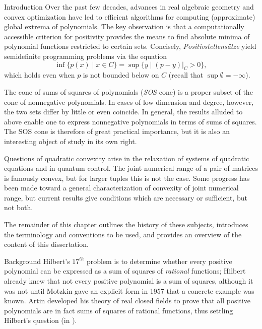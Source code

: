 \documentclass[12pt,oneside,final]{ucthesisucsbmath2010}
\theoremstyle{definition}
\begin{document}
\begin{chapter}{Introduction}
Over the past few decades, advances in real algebraic geometry and convex optimization have led to efficient algorithms for computing (approximate) global extrema of polynomials. The key observation is that a computationally accessible criterion for positivity provides the means to find absolute minima of polynomial functions restricted to certain sets. Concisely, \emph{Positivstellens\"{a}tze} yield semidefinite programming problems via the equation
\[ \inf \{p(x) \mid x \in C\} = \sup \{y \mid (p-y)|_C > 0\},\]
which holds even when $p$ is not bounded below on $C$ (recall that $\sup \emptyset = -\infty$).

The cone of sums of squares of polynomials (\emph{SOS} cone) is a proper subset of the cone of nonnegative polynomials. In cases of low dimension and degree, however, the two sets differ by little or even coincide. In general, the results alluded to above enable one to express nonnegative polynomials in terms of sums of squares. The SOS cone is therefore of great practical importance, but it is also an interesting object of study in its own right. 

Questions of quadratic convexity arise in the relaxation of systems of quadratic equations and in quantum control. The joint numerical range of a pair of matrices is famously convex, but for larger tuples this is not the case. Some progress has been made toward a general characterization of convexity of joint numerical range, but current results give conditions which are necessary or sufficient, but not both.

The remainder of this chapter outlines the history of these subjects, introduces the terminology and conventions to be used, and provides an overview of the content of this dissertation.


\begin{section}{Background}
Hilbert's $17^{th}$ problem is to determine whether every positive polynomial can be expressed as a sum of squares of \emph{rational} functions; Hilbert already knew that not every positive polynomial is a sum of squares, although it was not until Motzkin gave an explicit form in 1957 that a concrete example was known. Artin developed his theory of real closed fields to prove that all positive polynomials are in fact sums of squares of rational functions, thus settling Hilbert's question (in \cite{Artin}).


\end{section}
\end{chapter}
\end{document}
